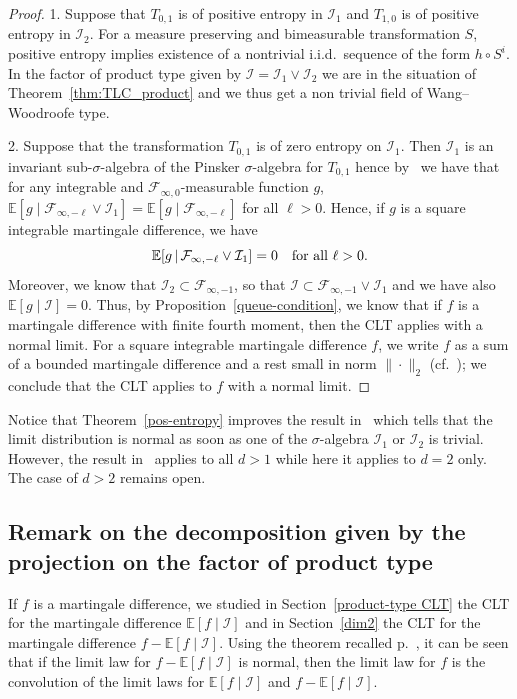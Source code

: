 \documentclass[10pt]{amsart}
\theoremstyle{definition}\newtheorem{defi}[theo]{Definition}\newtheorem{rema}[theo]{Remark}\newtheorem{exam}[theo]{Example}\newtheorem{exem}[theo]{Example}\newtheorem{nota}[theo]{Notation}
\newcommand{\bbE}{\mathbb{E}}
\newcommand{\E}[1]{\bbE\left[#1\right]}
\newcommand*\I{\mathcal{I}}
\newcommand*\F{\mathcal{F}}
\let\originalleft\left
\let\originalright\right
\renewcommand{\left}{\mathopen{}\mathclose\bgroup\originalleft}
\renewcommand{\right}{\aftergroup\egroup\originalright}
\begin{document}
\begin{proof}
1. Suppose that $T_{0,1}$ is of positive entropy in $\I_1$ and $T_{1,0}$ is of positive entropy in $\I_2$. For a measure preserving and bimeasurable transformation $S$, positive entropy implies existence of a nontrivial i.i.d.\ sequence of the form $h\circ S^i$. In the factor of product type given by $\I= \I_1\vee \I_2$ we are in the situation of Theorem~\ref{thm:TLC_product} and we thus get a non trivial field of Wang--Woodroofe type.

2. Suppose that the transformation $T_{0,1}$ is of zero entropy on $\I_1$. Then $\I_1$ is an invariant sub-$\sigma$-algebra of the Pinsker $\sigma$-algebra for $T_{0,1}$ hence by~\cite[Theorem~2]{MR928378} we have that for any integrable and $\F_{\infty,0}$-measurable function $g$, $\bbE[g\mid \F_{\infty, -\ell}\vee \I_1] = \bbE[g\mid \F_{\infty, -\ell}]$ for all $\ell >0$. Hence, if $g$ is a square integrable martingale difference, we have
\begin{equation*}
\E{g \,\middle|\,\F_{\infty, -\ell}\vee \I_1} = 0 \quad\text{for all } \ell >0.
\end{equation*}
Moreover, we know that $\I_2 \subset \F_{\infty,-1}$, so that $\I\subset \F_{\infty, -1}\vee \I_1$ and we have also $\bbE[g\mid\I]=0$. Thus, by Proposition~\ref{queue-condition}, we know that if $f$ is a martingale difference with finite fourth moment, then the CLT applies with a normal limit. For a square integrable martingale difference $f$, we write $f$ as a sum of a bounded martingale difference and a rest small in norm $\|\cdot\|_2$ (cf.~\cite[Theorem~4.2]{MR233396}); we conclude that the CLT applies to $f$ with a normal limit.
\end{proof}

Notice that Theorem~\ref{pos-entropy} improves the result in~\cite{MR3427925} which tells that the limit distribution is normal as soon as one of the $\sigma$-algebra $\I_1$ or $\I_2$ is trivial. However, the result in~\cite{MR3427925} applies to all $d>1$ while here it applies to $d=2$ only. The case of $d>2$ remains open.


\subsection{Remark on the decomposition given by the projection on the factor of product type}\label{convolution}

If $f$ is a martingale difference, we studied in Section~\ref{product-type CLT} the CLT for the martingale difference $\bbE[f \mid\I]$ and in Section~\ref{dim2} the CLT for the martingale difference $f-\bbE[f \mid\I]$. Using the theorem recalled p.~\pageref{thmdv}, it can be seen that if the limit law for $f-\bbE[f \mid\I]$ is normal, then the limit law for $f$ is the convolution of the limit laws for $\bbE[f \mid\I]$ and $f-\bbE[f \mid\I]$.
\end{document}
